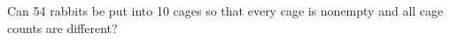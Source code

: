 Can 54 rabbits be put into 10 cages so that every cage is nonempty and all cage counts are different?
